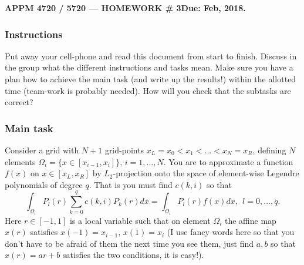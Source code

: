 \documentclass[12pt]{article}
\newcommand{\be}{\begin{equation}}
\newcommand{\ee}{\end{equation}}
\begin{document}
\begin{center}
\textbf{APPM 4720 / 5720 --- HOMEWORK  \# 3\hfill Due: Feb, 2018.}
\end{center}
\subsubsection*{Instructions}
Put away your cell-phone and read this document from start to finish. Discuss in the group what the different instructions and tasks mean. Make sure you have a plan how to achieve the main task (and write up the results!) within the allotted time (team-work is probably needed). How will you check that the subtasks are correct?      

\subsubsection*{Main task}
Consider a grid with $N+1$ grid-points $x_L = x_0 < x_1 < \ldots < x_N = x_R$, defining $N$ elements $\Omega_i = \{x \in [x_{i-1},x_i]\}, \, i = 1,\ldots,N$. You are to approximate a function $f(x)$ on $ x \in [x_L,x_R]$ by $L_2$-projection onto the space of element-wise Legendre polynomials of degree $q$. That is you must find $c(k,i)$ so that 
\be 
\int_{\Omega_i} P_l(r) \sum_{k=0}^{q} c(k,i) P_k(r) dx =  \int_{\Omega_i} P_l(r) f(x) dx, \ \  l = 0,\ldots,q. \label{eq:l2proj}
\ee
Here $r \in [-1,1]$ is a local variable such that on element $\Omega_i$ the affine map $x(r)$ satisfies $x(-1) = x_{i-1}$,  $x(1) = x_{i}$ (I use fancy words here so that you don't have to be afraid of them the next time you see them, just find $a, b$ so that $x(r) = ar + b$ satisfies the two conditions, it is easy!). 
\end{document}
